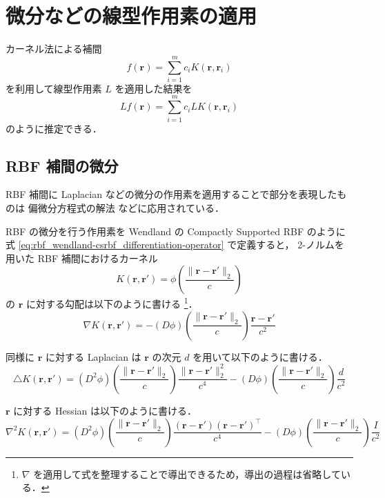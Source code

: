 %

\section{微分などの線型作用素の適用}\label{sec:interp_kernel_operators}

カーネル法による補間
\begin{equation}
    f(\bm{r}) = \sum_{i=1}^m c_i K(\bm{r}, \bm{r}_i)
\end{equation}
を利用して線型作用素 $L$ を適用した結果を
\begin{equation}
    L f(\bm{r}) = \sum_{i=1}^m c_i L K(\bm{r}, \bm{r}_i)
\end{equation}
のように推定できる．

\subsection{RBF 補間の微分}\label{sec:interp_kernel_operators_rbf-differentiation}

RBF 補間に Laplacian などの微分の作用素を適用することで部分を表現したものは
偏微分方程式の解法 \cite{Fornberg2015,Chu2023} などに応用されている．

RBF の微分を行う作用素を Wendland の Compactly Supported RBF のように
式 \eqref{eq:rbf_wendland-csrbf_differentiation-operator} で定義すると，
2-ノルムを用いた RBF 補間におけるカーネル
\begin{equation}
    K(\bm{r}, \bm{r}') = \phi\left(\frac{\|\bm{r} - \bm{r}'\|_2}{c}\right)
\end{equation}
の $\bm{r}$ に対する勾配は以下のように書ける
\footnote{$\nabla$ を適用して式を整理することで導出できるため，導出の過程は省略している．}．
\begin{equation}
    \nabla K(\bm{r}, \bm{r}') =
    - (D \phi)\left(\frac{\|\bm{r} - \bm{r}'\|_2}{c}\right) \frac{\bm{r} - \bm{r}'}{c^2}
\end{equation}

同様に $\bm{r}$ に対する Laplacian は $\bm{r}$ の次元 $d$ を用いて以下のように書ける．
\begin{equation}
    \triangle K(\bm{r}, \bm{r}') =
    (D^2 \phi)\left(\frac{\|\bm{r} - \bm{r}'\|_2}{c}\right) \frac{\|\bm{r} - \bm{r}'\|_2^2}{c^4}
    -(D \phi)\left(\frac{\|\bm{r} - \bm{r}'\|_2}{c}\right) \frac{d}{c^2}
\end{equation}

$\bm{r}$ に対する Hessian は以下のように書ける．
\begin{equation}
    \nabla^2 K(\bm{r}, \bm{r}') =
    (D^2 \phi)\left(\frac{\|\bm{r} - \bm{r}'\|_2}{c}\right) \frac{(\bm{r} - \bm{r}')(\bm{r} - \bm{r}')^\top}{c^4}
    -(D \phi)\left(\frac{\|\bm{r} - \bm{r}'\|_2}{c}\right) \frac{I}{c^2}
\end{equation}

